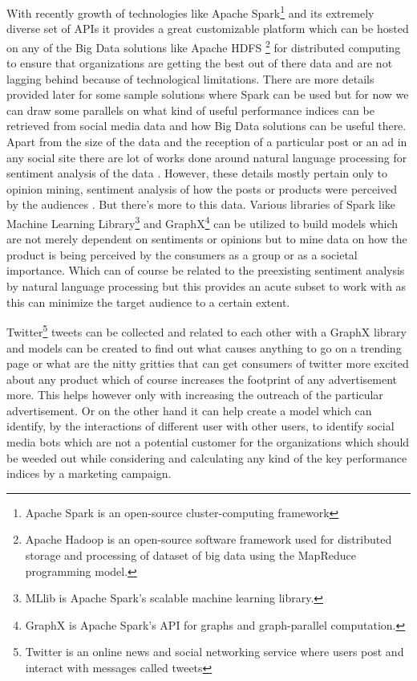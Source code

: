 \documentclass[sigconf]{acmart}
\begin{document}
With recently growth of technologies like Apache Spark\footnote{Apache Spark is an open-source cluster-computing framework} and its extremely diverse set of APIs it provides a great customizable platform which can be hosted on any of the Big Data solutions like Apache HDFS \footnote{Apache Hadoop is an open-source software framework used for distributed storage and processing of dataset of big data using the MapReduce programming model.} for distributed computing to ensure that organizations are getting the best out of there data and are not lagging behind because of technological limitations. There are more details provided later for some sample solutions where Spark can be used but for now we can draw some parallels on what kind of useful performance indices can be retrieved from social media data and how Big Data solutions can be useful there. Apart from the size of the data and the reception of a particular post or an ad in any social site there are lot of works done around natural language processing for sentiment analysis of the data \cite{IJIRSTV1I11036}. However, these details mostly pertain only to opinion mining, sentiment analysis of how the posts or products were perceived by the audiences \cite{Batrinca2015}. But there's more to this data. Various libraries of Spark like Machine Learning Library\footnote{MLlib is Apache Spark's scalable machine learning library.} and GraphX\footnote{GraphX is Apache Spark's API for graphs and graph-parallel computation.} can be utilized to build models which are not merely dependent on sentiments or opinions but to mine data on how the product is being perceived by the consumers as a group or as a societal importance. Which can of course be related to the preexisting sentiment analysis by natural language processing but this provides an acute subset to work with as this can minimize the target audience to a certain extent.

Twitter\footnote{Twitter is an online news and social networking service where users post and interact with messages called tweets} tweets can be collected and related to each other with a GraphX library and models can be created to find out what causes anything to go on a trending page or what are the nitty gritties that can get consumers of twitter more excited about any product which of course increases the footprint of any advertisement more. This helps however only with increasing the outreach of the particular advertisement. Or on the other hand it can help create a model which can identify, by the interactions of different user with other users, to identify social media bots which are not a potential customer for the organizations which should be weeded out while considering and calculating any kind of the key performance indices by a marketing campaign.
\end{document}
